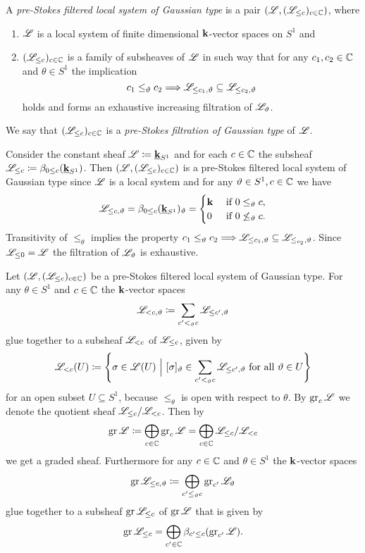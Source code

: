 \begin{defi}
A \emph{pre-Stokes filtered local system of Gaussian type} is a pair $(\mathscr{L}, (\mathscr{L}_{\leq c})_{c\in\mathbb{C}})$, where 
\begin{enumerate}
    \item $\mathscr{L}$ is a local system of finite dimensional $\mathbf{k}$-vector spaces on $S^1$ and
    \item $(\mathscr{L}_{\leq c})_{c \in \mathbb{C}}$ is a family of subsheaves of $\mathscr{L}$ in such way that for any $c_1, c_2 \in \mathbb{C}$ and $\theta \in S^1$ the implication 
    \[
    c_1 \leq_\vartheta c_2 \Longrightarrow \mathscr{L}_{\leq c_1, \vartheta} \subseteq \mathscr{L}_{\leq c_2, \vartheta}
    \]
    holds and forms an exhaustive increasing filtration of $\mathscr{L}_\vartheta$. 
\end{enumerate}
We say that $(\mathscr{L}_{\leq c})_{c \in \mathbb{C}}$ is a \emph{pre-Stokes filtration of Gaussian type} of $\mathscr{L}$.
\end{defi} 

\begin{ex}
    Consider the constant sheaf $\mathscr{L} \coloneqq \underline{\mathbf{k}}_{S^1}$ and for each $c \in \mathbb{C}$ the subsheaf $\mathscr{L}_{\leq c} \coloneqq \beta_{0 \leq c}(\underline{\mathbf{k}}_{S^1})$. Then $(\mathscr{L},(\mathscr{L}_{\leq c})_{c \in \mathbb{C}})$ is a pre-Stokes filtered local system of Gaussian type since $\mathscr{L}$ is a local system and for any $\vartheta \in S^1, c \in \mathbb{C}$ we have
    \[
    \mathscr{L}_{\leq c, \vartheta} = \beta_{0 \leq c}(\underline{\mathbf{k}}_{S^1})_\vartheta = \begin{cases} \mathbf{k} & \text{ if } 0 \leq_{\vartheta} c, \\ 0 & \text{ if } 0 \not\leq_{\vartheta} c.\end{cases}
    \]
    Transitivity of $\leq_{\theta}$ implies the property $c_1 \leq_{\vartheta} c_2 \Longrightarrow \mathscr{L}_{\leq c_1,\vartheta} \subseteq \mathscr{L}_{\leq_{c_2},\vartheta}$. Since $\mathscr{L}_{\leq 0} = \mathscr{L}$ the filtration of $\mathscr{L}_\vartheta$ is exhaustive.
\end{ex}

Let $(\mathscr{L},(\mathscr{L}_{\leq c})_{c\in\mathbb{C}})$ be a pre-Stokes filtered local system of Gaussian type.
For any $\theta \in S^1$ and $c \in \mathbb{C}$ the $\mathbf{k}$-vector spaces \[\mathscr{L}_{< c, \vartheta} \coloneqq \sum_{c' <_\vartheta c} \mathscr{L}_{\leq c', \vartheta}\] glue together to a subsheaf $\mathscr{L}_{< c}$ of $\mathscr{L}_{\leq c}$, given by 
\[\mathscr{L}_{< c}(U) \coloneqq \left\{ \sigma \in \mathscr{L}(U) ~ \Big\vert ~ [\sigma]_{\vartheta} \in \sum_{c' <_\vartheta c} \mathscr{L}_{\leq c', \vartheta} \text{ for all } \vartheta \in U\right\}\] for an open subset $U \subseteq S^1$, because $\leq_{\theta}$ is open with respect to $\theta$. By  $\operatorname{gr}_c \mathscr{L}$ we denote the quotient sheaf $\mathscr{L}_{\leq c}/\mathscr{L}_{< c}$. Then by
\[
\operatorname{gr} \mathscr{L} \coloneqq \bigoplus_{c \in \mathbb{C}}\operatorname{gr}_c\mathscr{L}=\bigoplus_{c\in \mathbb{C}} \mathscr{L}_{\leq c}/\mathscr{L}_{< c}
\] we get a graded sheaf. Furthermore for any $c \in \mathbb{C}$ and $\theta \in S^1$ the $\mathbf{k}$-vector spaces
\[\operatorname{gr} \mathscr{L}_{\leq c, \vartheta} \coloneqq \bigoplus_{c' \leq_\vartheta c} \operatorname{gr}_{c'}\mathscr{L}_\vartheta\] glue together to a subsheaf $\operatorname{gr}\mathscr{L}_{\leq c}$ of $\operatorname{gr}\mathscr{L}$ that is given by 
\[
\operatorname{gr}\mathscr{L}_{\leq c} = \bigoplus_{c' \in \mathbb{C}}\beta_{c' \leq c} (\operatorname{gr}_{c'}\mathscr{L}).
\]


